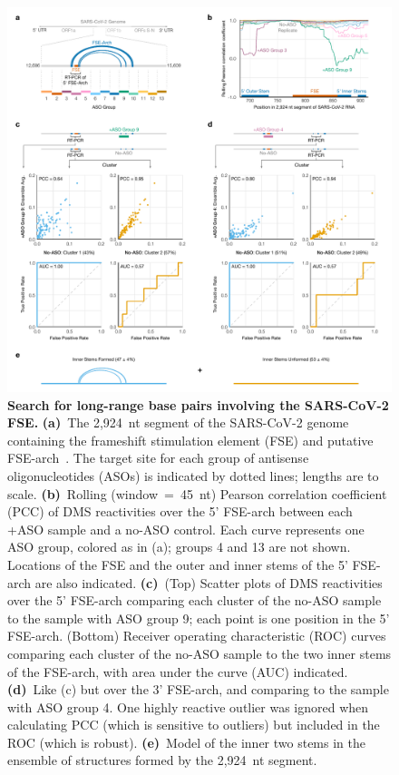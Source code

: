 \documentclass[main.tex]{subfiles}
\begin{document}
\begin{figure}[H]
	\includegraphics[width=\textwidth]{../MainFigures/sars2-tile/sars2-tile.pdf}
	\caption{\textbf{Search for long-range base pairs involving the SARS-CoV-2 FSE.} \textbf{(a)}~The 2,924~nt segment of the SARS-CoV-2 genome containing the frameshift stimulation element (FSE) and putative FSE-arch~\cite{Ziv2020}. The target site for each group of antisense oligonucleotides (ASOs) is indicated by dotted lines; lengths are to scale. \textbf{(b)}~Rolling (window~=~45~nt) Pearson correlation coefficient (PCC) of DMS reactivities over the 5' FSE-arch between each +ASO sample and a no-ASO control. Each curve represents one ASO group, colored as in (a); groups 4 and 13 are not shown. Locations of the FSE and the outer and inner stems of the 5' FSE-arch are also indicated. \textbf{(c)}~(Top) Scatter plots of DMS reactivities over the 5' FSE-arch comparing each cluster of the no-ASO sample to the sample with ASO group 9; each point is one position in the 5' FSE-arch. (Bottom) Receiver operating characteristic (ROC) curves comparing each cluster of the no-ASO sample to the two inner stems of the FSE-arch, with area under the curve (AUC) indicated. \textbf{(d)}~Like (c) but over the 3' FSE-arch, and comparing to the sample with ASO group 4. One highly reactive outlier was ignored when calculating PCC (which is sensitive to outliers) but included in the ROC (which is robust). \textbf{(e)}~Model of the inner two stems in the ensemble of structures formed by the 2,924~nt segment.}
	\label{tiles}
\end{figure}
\end{document}
